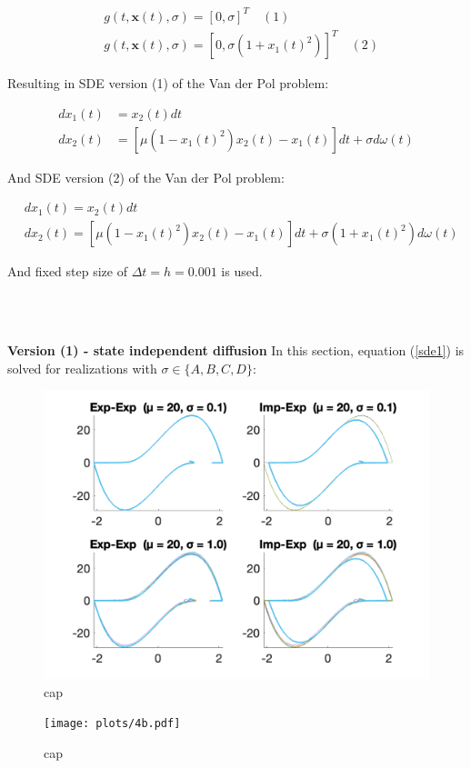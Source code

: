 \begin{align*}
    & g(t, \boldsymbol{x}(t), \sigma) = [0, \sigma]^T \quad (1) \\
    & g(t, \boldsymbol{x}(t), \sigma) = [0, \sigma (1 + x_1(t)^2)]^T \quad (2)
\end{align*}

Resulting in SDE version (1) of the Van der Pol problem:

\begin{equation}
\label{sde1}
\begin{aligned}
d x_{1}(t) &=x_{2}(t) d t \\
d x_{2}(t) &=\left[\mu\left(1-x_{1}(t)^{2}\right) x_{2}(t)-x_{1}(t)\right] d t+\sigma d \omega(t)
\end{aligned}
\end{equation}

And SDE version (2) of the Van der Pol problem:

\begin{equation}
\label{sde1}
\begin{aligned}
&d x_{1}(t)=x_{2}(t) d t \\
&d x_{2}(t)=\left[\mu\left(1-x_{1}(t)^{2}\right) x_{2}(t)-x_{1}(t)\right] d t+\sigma\left(1+x_{1}(t)^{2}\right) d \omega(t)
\end{aligned}
\end{equation}

And fixed step size of $\Delta t = h = 0.001$ is used.







\\\

\textbf{Version (1) - state independent diffusion}
In this section, equation (\ref{sde1}) is solved for realizations with $\sigma \in \{A,B,C,D\}$:

\begin{figure}
    \centering
    \includegraphics[width=\textwidth]{plots/4a.pdf}
    \caption{cap}
    \label{fig:4a}
\end{figure}

\begin{figure}
    \centering
    \texttt{[image: plots/4b.pdf]}
    \caption{cap}
    \label{fig:4b}
\end{figure}
